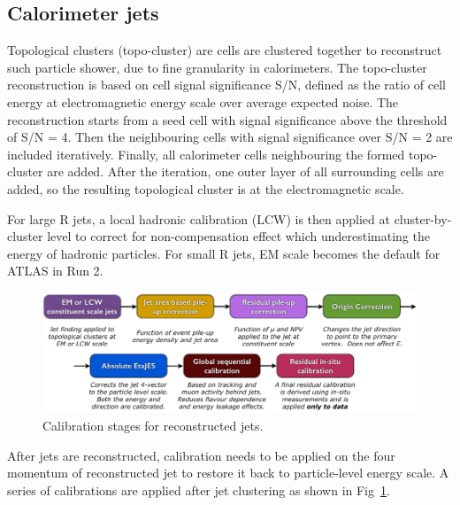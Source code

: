 \subsection{Calorimeter jets}
\label{sec:calo}
 \par Topological clusters (topo-cluster) are cells are clustered together to reconstruct such particle shower, due to fine granularity in calorimeters. 
 The topo-cluster reconstruction is based on cell signal significance S/N, defined as the ratio of cell energy at electromagnetic energy scale over average expected noise. 
 The reconstruction starts from a seed cell with signal significance above the threshold of S/N = 4. Then the neighbouring cells with signal significance over S/N = 2 are included iteratively.
 Finally, all calorimeter cells neighbouring the formed topo-cluster are added. After the iteration, one outer layer of all surrounding cells are added, 
 so the resulting topological cluster is at the electromagnetic scale.
\par For large R jets, a local hadronic calibration (LCW) is then applied at cluster-by-cluster level to correct for non-compensation effect which underestimating the energy of hadronic particles.
For small R jets, EM scale becomes the default for ATLAS in Run 2.
\begin{figure}[htbp]
    \centering
    \includegraphics[width=1\textwidth]{chapters/c5/figures/jet_calib}
    \caption{Calibration stages for reconstructed jets.}
    \label{fig:jet-calib}
\end{figure}
\par After jets are reconstructed, calibration needs to be applied on the four momentum of reconstructed jet to restore it back to particle-level energy scale.
A series of calibrations are applied after jet clustering as shown in Fig~\ref{fig:jet-calib}.

